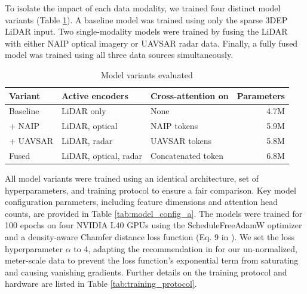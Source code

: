 \documentclass[remotesensing,article,submit,pdftex,moreauthors]{Definitions/mdpi}
\begin{document}
To isolate the impact of each data modality, we trained four distinct model variants (Table \ref{tab:model_variants}). A baseline model was trained using only the sparse 3DEP LiDAR input. Two single-modality models were trained by fusing the LiDAR with either NAIP optical imagery or UAVSAR radar data. Finally, a fully fused model was trained using all three data sources simultaneously.
\begin{table}[htbp]
  \centering
  \caption{Model variants evaluated}
  \label{tab:model_variants}
  \begin{tabular}{lllr}
  \toprule
  \textbf{Variant} & \textbf{Active encoders} & \textbf{Cross-attention on} & \textbf{Parameters} \\
  \midrule
 Baseline & LiDAR only & None  & 4.7M \\
  + NAIP & LiDAR, optical  & NAIP tokens & 5.9M \\
  + UAVSAR & LiDAR, radar & UAVSAR tokens  & 5.8M \\
  Fused  & LiDAR, optical, radar & Concatenated token  & 6.8M \\
  \bottomrule
  \end{tabular}
\end{table}

All model variants were trained using an identical architecture, set of hyperparameters, and training protocol to ensure a fair comparison. Key model configuration parameters, including feature dimensions and attention head counts, are provided in Table \ref{tab:model_config_a}. The models were trained for 100 epochs on four NVIDIA L40 GPUs using the ScheduleFreeAdamW optimizer \cite{defazio_road_2024} and a density-aware Chamfer distance loss function (Eq. 9 in \cite{wu_density-aware_2021}). We set the loss hyperparameter $\alpha$ to 4, adapting the recommendation in \cite{wu_density-aware_2021} for our un-normalized, meter-scale data to prevent the loss function's exponential term from saturating and causing vanishing gradients. Further details on the training protocol and hardware are listed in Table \ref{tab:training_protocol}.
\end{document}
